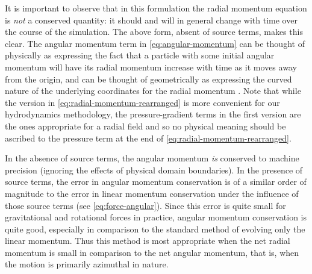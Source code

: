 \documentclass[12pt]{article}
\begin{document}
It is important to observe that in this formulation
the radial momentum equation is \textit{not} a conserved quantity: it should and
will in general change with time over the course of the simulation. The above form,
absent of source terms, makes this clear. The angular momentum term in
\autoref{eq:angular-momentum} can be thought of physically as expressing the fact
that a particle with some initial angular momentum will have its radial momentum
increase with time as it moves away from the origin, and can be thought of geometrically
as expressing the curved nature of the underlying coordinates for the radial momentum
\citep{motl:2002}. Note that while the version in \autoref{eq:radial-momentum-rearranged}
is more convenient for our hydrodynamics methodology, the pressure-gradient terms
in the first version are the ones appropriate for a radial field and so no physical meaning
should be ascribed to the pressure term at the end of \autoref{eq:radial-momentum-rearranged}.

In the absence of source terms, the angular momentum \textit{is} conserved
to machine precision (ignoring the effects of physical domain boundaries). In the
presence of source terms, the error in angular momentum conservation is of a
similar order of magnitude to the error in linear momentum conservation under
the influence of those source terms (see \autoref{eq:force-angular}). Since this
error is quite small for gravitational and rotational forces in practice, angular
momentum conservation is quite good, especially in comparison to the standard
method of evolving only the linear momentum. Thus this method is most appropriate
when the net radial momentum is small in comparison to the net angular momentum,
that is, when the motion is primarily azimuthal in nature.
\end{document}
